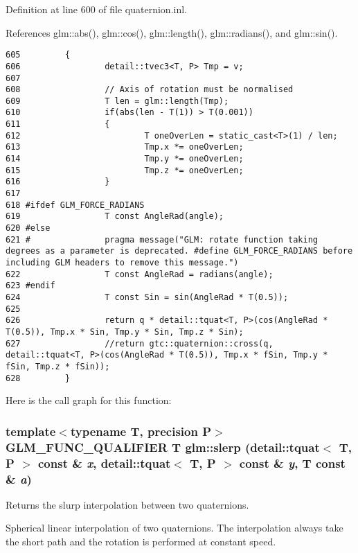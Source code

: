 Definition at line 600 of file quaternion.inl.

References glm::abs(), glm::cos(), glm::length(), glm::radians(), and glm::sin().

\begin{Code}\begin{verbatim}605         {
606                 detail::tvec3<T, P> Tmp = v;
607 
608                 // Axis of rotation must be normalised
609                 T len = glm::length(Tmp);
610                 if(abs(len - T(1)) > T(0.001))
611                 {
612                         T oneOverLen = static_cast<T>(1) / len;
613                         Tmp.x *= oneOverLen;
614                         Tmp.y *= oneOverLen;
615                         Tmp.z *= oneOverLen;
616                 }
617 
618 #ifdef GLM_FORCE_RADIANS
619                 T const AngleRad(angle);
620 #else
621 #               pragma message("GLM: rotate function taking degrees as a parameter is deprecated. #define GLM_FORCE_RADIANS before including GLM headers to remove this message.")
622                 T const AngleRad = radians(angle);
623 #endif
624                 T const Sin = sin(AngleRad * T(0.5));
625 
626                 return q * detail::tquat<T, P>(cos(AngleRad * T(0.5)), Tmp.x * Sin, Tmp.y * Sin, Tmp.z * Sin);
627                 //return gtc::quaternion::cross(q, detail::tquat<T, P>(cos(AngleRad * T(0.5)), Tmp.x * fSin, Tmp.y * fSin, Tmp.z * fSin));
628         }
\end{verbatim}
\end{Code}




Here is the call graph for this function:\hypertarget{group__gtc__quaternion_ga75cee4315cd8e7f15eaac3ea944106a}{
\subsubsection[slerp]{\setlength{\rightskip}{0pt plus 5cm}template$<$typename T, precision P$>$ GLM\_\-FUNC\_\-QUALIFIER T glm::slerp (detail::tquat$<$ T, P $>$ const \& {\em x}, \/  detail::tquat$<$ T, P $>$ const \& {\em y}, \/  T const \& {\em a})}}
\label{group__gtc__quaternion_ga75cee4315cd8e7f15eaac3ea944106a}


Returns the slurp interpolation between two quaternions. 

Spherical linear interpolation of two quaternions. The interpolation always take the short path and the rotation is performed at constant speed.


